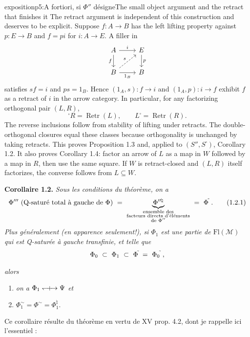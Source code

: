 \begin{dcomment}{exposition}{p5:A fortiori, si $\Phi''$ désigne}{The small object argument and the retract that finishes it}
The retract argument is independent of this construction and deserves to be explicit. Suppose $f:A\to B$ has the left lifting property against $p:E\to B$ and $f=pi$ for $i:A\to E$. A filler in
\[
\begin{tikzcd}
A\arrow[r,"i"]\arrow[d,"f"'] & E\arrow[d,"p"]\\
B\arrow[r,"1_B"']\arrow[ur,dashed,"s"] & B
\end{tikzcd}
\]
satisfies $sf=i$ and $ps=1_B$. Hence $(1_A,s):f\to i$ and $(1_A,p):i\to f$ exhibit $f$ as a retract of $i$ in the arrow category. In particular, for any factorizing orthogonal pair $(L,R)$,
\[
{}^{\square}R=\operatorname{Retr}(L),\qquad
L^{\square}=\operatorname{Retr}(R).
\]
The reverse inclusions follow from stability of lifting under retracts. The double-orthogonal closures equal these classes because orthogonality is unchanged by taking retracts. This proves Proposition 1.3 and, applied to $(S'',S^{\square})$, Corollary 1.2. It also proves Corollary 1.4: factor an arrow of $L$ as a map in $W$ followed by a map in $R$, then use the same square. If $W$ is retract-closed and $(L,R)$ itself factorizes, the converse follows from $L\subseteq W$.
\end{dcomment}


\bigskip

\textbf{Corollaire 1.2.} \textit{Sous les conditions du théorème, on a}
\[
\Phi''' \ \text{(Q-saturé total à gauche de $\Phi$)} \ = \
\underbrace{\Phi^{\prime\prime\natural}}_{\substack{\text{ensemble des}\\ \text{facteurs directs d'éléments}\\ \text{de $\Phi''$}}}
\ = \ \Phi^{\tilde{}}\ .
\tag*{(1.2.1)}
\]
\textit{Plus généralement (en apparence seulement!), si $\Phi_1$ est une partie de \textup{$\mathrm{Fl}(\mathcal{M})$} qui est \textup{Q}-saturée à gauche transfinie, et telle que}
\[
\Phi_0 \ \subset \ \Phi_1 \ \subset \ \Phi^{\tld} \ = \ \Phi_0{}^{\tld}\ ,
\]


\textit{alors}
\begin{enumerate}[label={}]
\item[a)] \textit{on a $\Phi_1 \mathrel{\leftharpoondown\mkern-9mu{+}\mkern-9mu\rightarrow} \Psi$ et} %
\item[b)] $\Phi_1^{\sim} = \Phi^{\sim} = \Phi_1^{\natural}$.
\end{enumerate}
Ce corollaire résulte du théorème en vertu de XV prop. 4.2, dont je rappelle ici l'essentiel :

